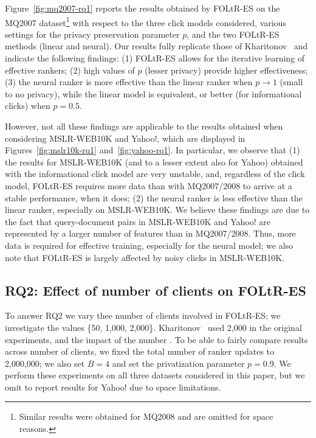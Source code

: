 Figure~\ref{fig:mq2007-rq1} reports the results obtained by FOLtR-ES on the MQ2007 dataset\footnote{Similar results were obtained for MQ2008 and are omitted for space reasons.} with respect to the three click models considered, various settings for the privacy preservation parameter $p$, and the two FOLtR-ES methods (linear and neural). Our results fully replicate those of Kharitonov~\cite{kharitonov2019federated} and indicate the following findings: (1) FOLtR-ES allows for the iterative learning of effective rankers; (2) high values of $p$ (lesser privacy) provide higher effectiveness; 
(3) the neural ranker is more effective than the linear ranker when $p \rightarrow 1$ (small to no privacy), while the linear model is equivalent, or better (for informational clicks) when $p=0.5$. 

However, not all these findings are applicable to the results obtained when considering MSLR-WEB10K and Yahoo!, which are displayed in Figures~\ref{fig:mslr10k-rq1} and~\ref{fig:yahoo-rq1}. In particular, we observe that (1) the results for MSLR-WEB10K (and to a lesser extent also for Yahoo) obtained with the informational click model are very unstable, and, regardless of the click model, FOLtR-ES requires more data than with MQ2007/2008 to arrive at a stable performance, when it does; (2) the neural ranker is less effective than the linear ranker, especially on MSLR-WEB10K. We believe these findings are due to the fact that query-document pairs in MSLR-WEB10K and Yahoo! are represented by a larger number of features than in MQ2007/2008. Thus, more data is required for effective training, especially for the neural model; we also note that FOLtR-ES is largely affected by noisy clicks in MSLR-WEB10K. 

\subsection{RQ2: Effect of number of clients on FOLtR-ES}
To answer RQ2 we vary thee number of clients involved in FOLtR-ES; we investigate the values \{50, 1,000, 2,000\}. Kharitonov~\cite{kharitonov2019federated} used 2,000 in the original experiments, and the impact of the number . To be able to fairly compare results across number of clients, we fixed the total number of ranker updates to 2,000,000; we also set $B = 4$ and set the privatization parameter $p=0.9$. We perform these experiments on all three datasets considered in this paper, but we omit to report results for Yahoo! due to space limitations. 

